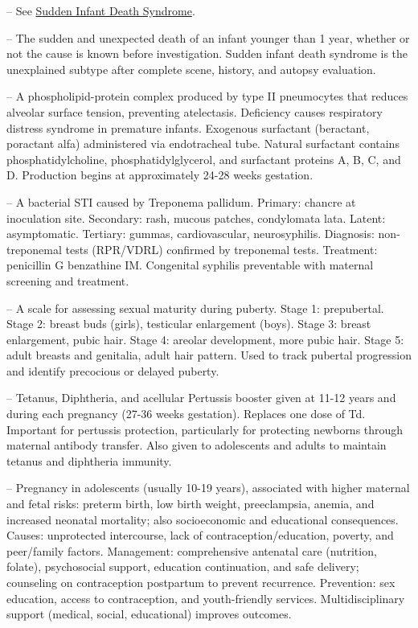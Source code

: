 -- See \hyperlink{Sudden Infant Death Syndrome}{Sudden Infant Death Syndrome}.

-- The sudden and unexpected death of an infant younger than 1 year, whether or not the cause is known before investigation. Sudden infant death syndrome is the unexplained subtype after complete scene, history, and autopsy evaluation.

-- A phospholipid-protein complex produced by type II pneumocytes that reduces alveolar surface tension, preventing atelectasis. Deficiency causes respiratory distress syndrome in premature infants. Exogenous surfactant (beractant, poractant alfa) administered via endotracheal tube. Natural surfactant contains phosphatidylcholine, phosphatidylglycerol, and surfactant proteins A, B, C, and D. Production begins at approximately 24-28 weeks gestation.

-- A bacterial STI caused by Treponema pallidum. Primary: chancre at inoculation site. Secondary: rash, mucous patches, condylomata lata. Latent: asymptomatic. Tertiary: gummas, cardiovascular, neurosyphilis. Diagnosis: non-treponemal tests (RPR/VDRL) confirmed by treponemal tests. Treatment: penicillin G benzathine IM. Congenital syphilis preventable with maternal screening and treatment.

-- A scale for assessing sexual maturity during puberty. Stage 1: prepubertal. Stage 2: breast buds (girls), testicular enlargement (boys). Stage 3: breast enlargement, pubic hair. Stage 4: areolar development, more pubic hair. Stage 5: adult breasts and genitalia, adult hair pattern. Used to track pubertal progression and identify precocious or delayed puberty.

-- Tetanus, Diphtheria, and acellular Pertussis booster given at 11-12 years and during each pregnancy (27-36 weeks gestation). Replaces one dose of Td. Important for pertussis protection, particularly for protecting newborns through maternal antibody transfer. Also given to adolescents and adults to maintain tetanus and diphtheria immunity.

-- Pregnancy in adolescents (usually 10-19 years), associated with higher maternal and fetal risks: preterm birth, low birth weight, preeclampsia, anemia, and increased neonatal mortality; also socioeconomic and educational consequences. Causes: unprotected intercourse, lack of contraception/education, poverty, and peer/family factors. Management: comprehensive antenatal care (nutrition, folate), psychosocial support, education continuation, and safe delivery; counseling on contraception postpartum to prevent recurrence. Prevention: sex education, access to contraception, and youth-friendly services. Multidisciplinary support (medical, social, educational) improves outcomes.

